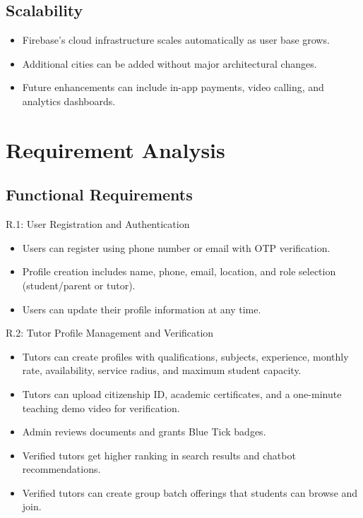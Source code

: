 \documentclass[12pt]{report}
\begin{document}
\subsection{Scalability}

\begin{itemize}
\item Firebase's cloud infrastructure scales automatically as user base grows.
\item Additional cities can be added without major architectural changes.
\item Future enhancements can include in-app payments, video calling, and analytics dashboards.
\end{itemize}

\section{Requirement Analysis}

\subsection{Functional Requirements}

\noindent R.1: User Registration and Authentication
\begin{itemize}
\item Users can register using phone number or email with OTP verification.
\item Profile creation includes name, phone, email, location, and role selection (student/parent or tutor).
\item Users can update their profile information at any time.
\end{itemize}

\noindent R.2: Tutor Profile Management and Verification
\begin{itemize}
\item Tutors can create profiles with qualifications, subjects, experience, monthly rate, availability, service radius, and maximum student capacity.
\item Tutors can upload citizenship ID, academic certificates, and a one-minute teaching demo video for verification.
\item Admin reviews documents and grants Blue Tick badges.
\item Verified tutors get higher ranking in search results and chatbot recommendations.
\item Verified tutors can create group batch offerings that students can browse and join.
\end{itemize}
\end{document}
